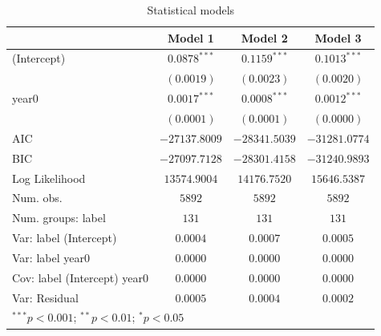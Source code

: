 
\begin{table}
\begin{center}
\begin{tabular}{l c c c}
\hline
 & Model 1 & Model 2 & Model 3 \\
\hline
(Intercept)                  & $0.0878^{***}$ & $0.1159^{***}$ & $0.1013^{***}$ \\
                             & $(0.0019)$     & $(0.0023)$     & $(0.0020)$     \\
year0                        & $0.0017^{***}$ & $0.0008^{***}$ & $0.0012^{***}$ \\
                             & $(0.0001)$     & $(0.0001)$     & $(0.0000)$     \\
\hline
AIC                          & $-27137.8009$  & $-28341.5039$  & $-31281.0774$  \\
BIC                          & $-27097.7128$  & $-28301.4158$  & $-31240.9893$  \\
Log Likelihood               & $13574.9004$   & $14176.7520$   & $15646.5387$   \\
Num. obs.                    & $5892$         & $5892$         & $5892$         \\
Num. groups: label           & $131$          & $131$          & $131$          \\
Var: label (Intercept)       & $0.0004$       & $0.0007$       & $0.0005$       \\
Var: label year0             & $0.0000$       & $0.0000$       & $0.0000$       \\
Cov: label (Intercept) year0 & $0.0000$       & $0.0000$       & $0.0000$       \\
Var: Residual                & $0.0005$       & $0.0004$       & $0.0002$       \\
\hline
\multicolumn{4}{l}{\scriptsize{$^{***}p<0.001$; $^{**}p<0.01$; $^{*}p<0.05$}}
\end{tabular}
\caption{Statistical models}
\label{table:coefficients}
\end{center}
\end{table}
